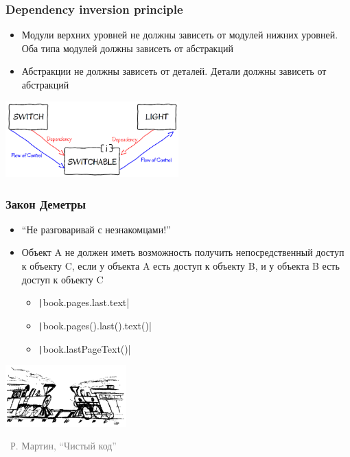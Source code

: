 \documentclass[xetex,mathserif,serif]{beamer}
\newcommand{\attribution}[1] {
\vspace{-5mm}\begin{flushright}\begin{scriptsize}\textcolor{gray}{\textcopyright\, #1}\end{scriptsize}\end{flushright}
}
\begin{document}
	\begin{frame}
		\frametitle{Dependency inversion principle}
		\begin{itemize}
			\item Модули верхних уровней не должны зависеть от модулей нижних уровней. Оба типа модулей должны зависеть от абстракций
			\item Абстракции не должны зависеть от деталей. Детали должны зависеть от абстракций
		\end{itemize}
		\begin{flushright}
			\includegraphics[width=0.5\textwidth]{dependencyInversionPrinciple.png}
		\end{flushright}
	\end{frame}

	\begin{frame}
		\frametitle{Закон Деметры}
		\begin{itemize}
			\item ``Не разговаривай с незнакомцами!''
			\item Объект A не должен иметь возможность получить непосредственный доступ к объекту C, если у объекта A есть доступ к объекту B, и у объекта B есть доступ к объекту C
			\begin{itemize}
				\item \texttt|book.pages.last.text|
				\item \texttt|book.pages().last().text()|
				\item \texttt|book.lastPageText()|
			\end{itemize}
		\end{itemize}
		\begin{flushright}
			\includegraphics[width=0.35\textwidth]{trains.png}
		\end{flushright}
		\attribution{Р. Мартин, ``Чистый код''}
	\end{frame}
\end{document}
